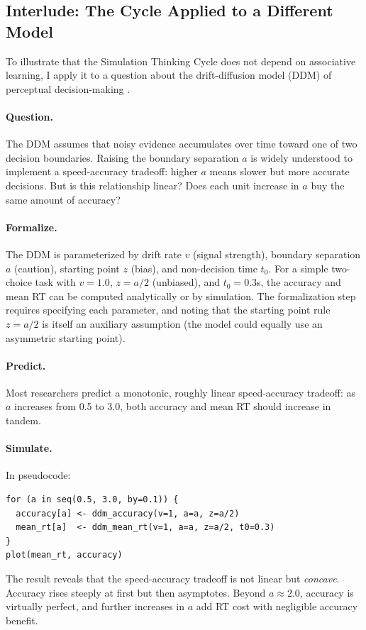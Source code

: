 \documentclass[fleqn,10pt]{wlscirep}
\begin{document}
\begin{linenumbers}
\section*{Interlude: The Cycle Applied to a Different Model}

To illustrate that the Simulation Thinking Cycle does not depend on associative learning, I apply it to a question about the drift-diffusion model (DDM) of perceptual decision-making \citep{ratcliff2008diffusion}.

\paragraph{Question.} The DDM assumes that noisy evidence accumulates over time toward one of two decision boundaries. Raising the boundary separation $a$ is widely understood to implement a speed-accuracy tradeoff: higher $a$ means slower but more accurate decisions. But is this relationship linear? Does each unit increase in $a$ buy the same amount of accuracy?

\paragraph{Formalize.} The DDM is parameterized by drift rate $v$ (signal strength), boundary separation $a$ (caution), starting point $z$ (bias), and non-decision time $t_0$. For a simple two-choice task with $v = 1.0$, $z = a/2$ (unbiased), and $t_0 = 0.3$s, the accuracy and mean RT can be computed analytically \citep{navarro2009fast} or by simulation. The formalization step requires specifying each parameter, and noting that the starting point rule $z = a/2$ is itself an auxiliary assumption (the model could equally use an asymmetric starting point).

\paragraph{Predict.} Most researchers predict a monotonic, roughly linear speed-accuracy tradeoff: as $a$ increases from 0.5 to 3.0, both accuracy and mean RT should increase in tandem.

\paragraph{Simulate.} In pseudocode:
\begin{verbatim}
for (a in seq(0.5, 3.0, by=0.1)) {
  accuracy[a] <- ddm_accuracy(v=1, a=a, z=a/2)
  mean_rt[a]  <- ddm_mean_rt(v=1, a=a, z=a/2, t0=0.3)
}
plot(mean_rt, accuracy)
\end{verbatim}
The result reveals that the speed-accuracy tradeoff is not linear but \emph{concave}. Accuracy rises steeply at first but then asymptotes. Beyond $a \approx 2.0$, accuracy is virtually perfect, and further increases in $a$ add RT cost with negligible accuracy benefit.


\end{linenumbers}
\end{document}
